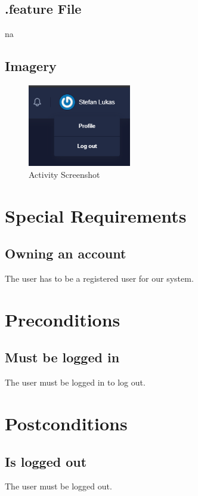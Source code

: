 \documentclass[a4paper,12pt,chapterprefix=false,bibliography=totoc,listof=totoc,book]{scrreprt}
\begin{document}
    \section{.feature File}
    \gls{na}

    \section{Imagery}
    \begin{figure}[H]
        \includegraphics[width=0.4\textwidth]{diagramms/UCLogoutUserScreenshot.png}
        \caption{Activity Screenshot}
        \label{fig:screen}
    \end{figure}

    \chapter{Special Requirements}
    \section{Owning an account}
    The user has to be a registered user for our system.

    \chapter{Preconditions}
    \section{Must be logged in}
    The user must be logged in to log out.

    \chapter{Postconditions}
    \section{Is logged out}
    The user must be logged out.
\end{document}
